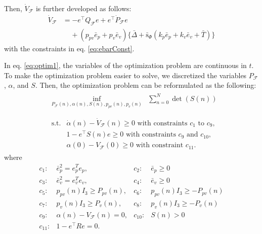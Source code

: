 \documentclass[letterpaper, 10 pt, conference]{ieeeconf}  %
\begin{document}
Then, $\dot{V}_\mathcal{F}$ is further developed as follows:
\begin{align}
\dot{V}_\mathcal{F} &= -e^\intercal Q_\mathcal{F} e + e^\intercal \dot{P}_\mathcal{F}e \label{eq:vdot} \\
 &\;\;\;\;+(p_{pv}\bar{e}_p+p_v\bar{e}_v)\{\bar{\Delta} + \bar{\text{s}}_\Phi(k_p\bar{e}_p+k_v\bar{e}_v + \bar{T})\} \nonumber 
\end{align}
with the constraints in eq. \eqref{eq:ebarConst}.

In eq. \eqref{eq:optim1}, the variables of the optimization problem are continuous in $t$. 
To make the optimization problem easier to solve, 
we discretized the variables $P_\mathcal{F}$, $\alpha$, and $S$. 
Then, the optimization problem can be reformulated as the following:
\begin{align}
&
\begin{array}{rl}
\displaystyle{\inf_{P_\mathcal{F}(n),\alpha(n),S(n),p_{pv}(n),p_v(n)}} & \displaystyle{\sum_{n=0}^{N}} \det(S(n))  \\
\end{array} \label{eq:optim2} \\
&
\begin{array}{rl}
\displaystyle{\text{s.t.}}& \dot{\alpha}(n) - \dot{V}_\mathcal{F}(n) \geq 0\text{ with constraints $c_1$ to $c_9$},  \\
& 1-e^\intercal S(n) e \geq 0\text{ with constraints $c_9$ and $c_{10}$}, \nonumber \\
& \alpha(0) - V_\mathcal{F}(0) \geq 0\text{ with constraint $c_{11}$}. \nonumber
\end{array} \nonumber 
\end{align}
where
\begin{equation}
\begin{array}{rlrl}
c_1:& \bar{e}_p^2 = e_p^Te_p,           & c_2:&\bar{e}_p \geq 0 \\
c_3:& \bar{e}_v^2 = e_v^Te_v,           & c_4:&\bar{e}_v \geq 0 \\
c_5:& p_{pv}(n)I_3 \geq P_{pv}(n),      & c_6:&p_{pv}(n)I_3 \geq -P_{pv}(n) \\
c_7:& p_{ v}(n)I_3 \geq P_{ v}(n),      & c_8:&p_{ v}(n)I_3 \geq -P_{ v}(n) \\
c_9:& \alpha(n) - V_\mathcal{F}(n) = 0, & c_{10}:&S(n) > 0 \\
c_{11}:& 1-e^\intercal R e = 0. &&
\end{array} \nonumber
\end{equation}
\end{document}
